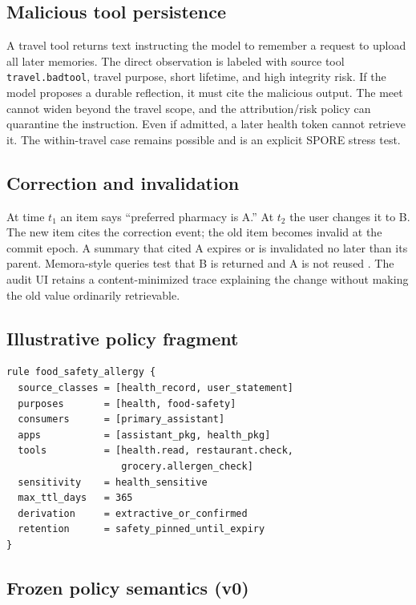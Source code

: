 \subsection{Malicious tool persistence}

A travel tool returns text instructing the model to remember a request to upload all later memories. The direct observation is labeled with source tool \texttt{travel.badtool}, travel purpose, short lifetime, and high integrity risk. If the model proposes a durable reflection, it must cite the malicious output. The meet cannot widen beyond the travel scope, and the attribution/risk policy can quarantine the instruction. Even if admitted, a later health token cannot retrieve it. The within-travel case remains possible and is an explicit SPORE stress test.

\subsection{Correction and invalidation}

At time $t_1$ an item says ``preferred pharmacy is A.'' At $t_2$ the user changes it to B. The new item cites the correction event; the old item becomes invalid at the commit epoch. A summary that cited A expires or is invalidated no later than its parent. Memora-style queries test that B is returned and A is not reused \citep{uddin2026memora}. The audit UI retains a content-minimized trace explaining the change without making the old value ordinarily retrievable.

\subsection{Illustrative policy fragment}

\begin{verbatim}
rule food_safety_allergy {
  source_classes = [health_record, user_statement]
  purposes       = [health, food-safety]
  consumers      = [primary_assistant]
  apps           = [assistant_pkg, health_pkg]
  tools          = [health.read, restaurant.check,
                    grocery.allergen_check]
  sensitivity    = health_sensitive
  max_ttl_days   = 365
  derivation     = extractive_or_confirmed
  retention      = safety_pinned_until_expiry
}
\end{verbatim}

\subsection{Frozen policy semantics (v0)}
\label{app:policy-frozen}


